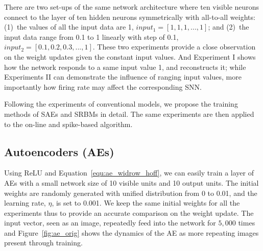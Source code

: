 There are two set-ups of the same network architecture where ten visible neurons connect to the layer of ten hidden neurons symmetrically with all-to-all weights: (1)~the values of all the input data are 1, $input_1 = [1, 1, 1,...,1]$; and (2)~the input data range from 0.1 to 1 linearly with step of 0.1, $input_2 = [0.1, 0.2, 0.3,...,1]$.
These two experiments provide a close observation on the weight updates given the constant input values.
And Experiment I shows how the network responds to a same input value 1, and reconstructs it; while Experiments II can demonstrate the influence of ranging input values, more importantly how firing rate may affect the corresponding SNN.

Following the experiments of conventional models, we propose the training methods of SAEs and SRBMs in detail.
The same experiments are then applied to the on-line and spike-based algorithm.

\subsection{Autoencoders (AEs)}
\label{sec:ae}
Using ReLU and Equation~\ref{equ:ae_widrow_hoff}, we can easily train a layer of AEs with a small network size of 10 visible units and 10 output units.
The initial weights are randomly generated with unified distribution from 0 to 0.01, and the learning rate, $\eta$, is set to 0.001.
We keep the same initial weights for all the experiments thus to provide an accurate comparison on the weight update.
The input vector, seen as an image, repeatedly feed into the network for $5,000$ times and Figure~\ref{fig:ae_orig} shows the dynamics of the AE as more repeating images present through training.

